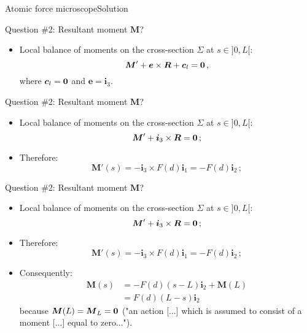 \documentclass{beamer}
\newcommand{\cj}{c}
\newcommand{\cv}{{\boldsymbol\cj}}
\newcommand{\ej}{e}
\renewcommand{\ij}{i}
\newcommand{\ev}{{\boldsymbol\ej}}
\newcommand{\iv}{{\boldsymbol\ij}}
\newcommand{\Fresj}{R}
\newcommand{\Mresj}{M}
\newcommand{\Fres}{{\boldsymbol\Fresj}}
\newcommand{\Mres}{{\boldsymbol\Mresj}}
\newcommand{\bzero}{{\bf 0}}
\begin{document}
\begin{frame}{Atomic force microscope}{Solution}

\begin{overprint}

\vskip-20pt
\begin{exampleblock}{Question \#2: Resultant moment $\Mres$?}
\begin{itemize}
\item Local balance of moments on the cross-section $\Sigma$ at $s\in]0,L[$:
\begin{displaymath}
\Mres'+\ev\times\Fres+\cv_l=\bzero\,,
\end{displaymath}
where $\cv_l=\bzero$ and $\ev=\iv_3$.
\end{itemize}
\end{exampleblock}

\vskip-20pt
\begin{exampleblock}{Question \#2: Resultant moment $\Mres$?}
\begin{itemize}
\item Local balance of moments on the cross-section $\Sigma$ at $s\in]0,L[$:
\begin{displaymath}
\Mres'+\iv_3\times\Fres=\bzero\,;
\end{displaymath}
\item Therefore:
\begin{displaymath}
\Mres'(s)=-\iv_3\times F(d)\iv_1=-F(d)\iv_2\,;
\end{displaymath}
\end{itemize}
\end{exampleblock}

\vskip-20pt
\begin{exampleblock}{Question \#2: Resultant moment $\Mres$?}
\begin{itemize}
\item Local balance of moments on the cross-section $\Sigma$ at $s\in]0,L[$:
\begin{displaymath}
\Mres'+\iv_3\times\Fres=\bzero\,;
\end{displaymath}
\item Therefore:
\begin{displaymath}
\Mres'(s)=-\iv_3\times F(d)\iv_1=-F(d)\iv_2\,;
\end{displaymath}
\item Consequently:
\begin{displaymath}
\begin{split}
\Mres(s) &=-F(d)(s-L)\iv_2+\Mres(L) \\
&=F(d)(L-s)\iv_2
\end{split}
\end{displaymath}
because $\Mres(L)=\Mres_L=\bzero$ ("an action [...] which is assumed to consist of a moment [...] equal to zero...").
\end{itemize}
\end{exampleblock}


\end{overprint}
\end{frame}
\end{document}
